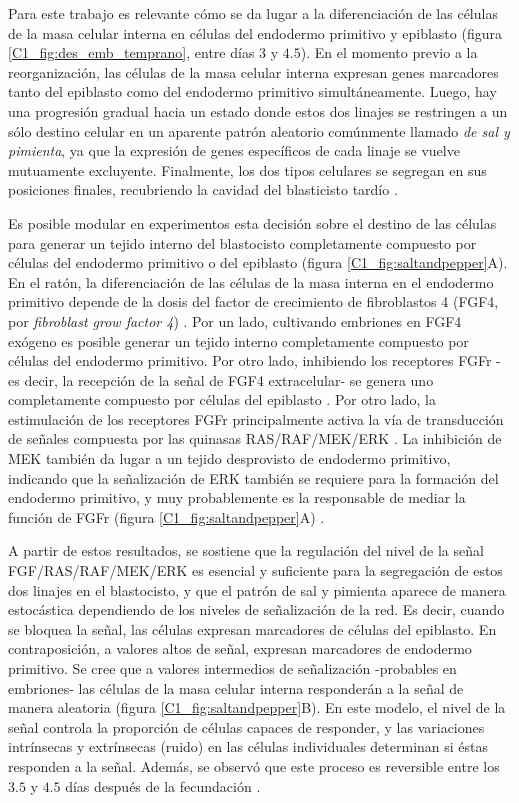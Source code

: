 \documentclass[./main.tex]{subfiles}
\begin{document}
Para este trabajo es relevante cómo se da lugar a la diferenciación de las células de la masa celular interna en células del endodermo primitivo y epiblasto (figura \ref{C1_fig:des_emb_temprano}, entre días $3$ y $4.5$). En el momento previo a la reorganización, las células de la masa celular interna expresan genes marcadores tanto del epiblasto como del endodermo primitivo simultáneamente. Luego, hay una progresión gradual hacia un estado donde estos dos linajes se restringen a un sólo destino celular en un aparente patrón aleatorio comúnmente llamado \emph{de sal y pimienta}, ya que la expresión de genes específicos de cada linaje se vuelve mutuamente excluyente. Finalmente, los dos tipos celulares se segregan en sus posiciones finales, recubriendo la cavidad del blasticisto tardío \cite{Plusa2008}. 


Es posible modular en experimentos esta decisión sobre el destino de las células para generar un tejido interno del blastocisto completamente compuesto por células del endodermo primitivo o del epiblasto (figura \ref{C1_fig:saltandpepper}A). En el ratón, la diferenciación de las células de la masa interna en el endodermo primitivo depende de la dosis del factor de crecimiento de fibroblastos 4 (FGF4, por \textit{fibroblast grow factor 4}) \cite{Kang2013,Krawchuk2013,Ohnishi2014}. Por un lado, cultivando embriones en FGF4 exógeno es posible generar un tejido interno completamente compuesto por células del endodermo primitivo. Por otro lado, inhibiendo los receptores FGFr -es decir, la recepción de la señal de FGF4 extracelular- se genera uno completamente compuesto por células del epiblasto \cite{Yamanaka2010,Grabarek2012}. Por otro lado, la estimulación de los receptores FGFr principalmente activa la vía de transducción de señales compuesta por las quinasas RAS/RAF/MEK/ERK \cite{Brewer2016}. La inhibición de MEK también da lugar a un tejido desprovisto de endodermo primitivo, indicando que la señalización de ERK también se requiere para la formación del endodermo primitivo, y muy probablemente es la responsable de mediar la función de FGFr (figura \ref{C1_fig:saltandpepper}A) \cite{Nichols2009}.  


A partir de estos resultados, se sostiene que la regulación del nivel de la señal FGF/RAS/RAF/MEK/ERK es esencial y suficiente para la segregación de estos dos linajes en el blastocisto, y que el patrón de sal y pimienta aparece de manera estocástica dependiendo de los niveles de señalización de la red. Es decir, cuando se bloquea la señal, las células expresan marcadores de células del epiblasto. En contraposición, a valores altos de señal, expresan marcadores de endodermo primitivo. Se cree que a valores intermedios de señalización -probables en embriones- las células de la masa celular interna responderán a la señal de manera aleatoria (figura \ref{C1_fig:saltandpepper}B). En este modelo, el nivel de la señal controla la proporción de células capaces de responder, y las variaciones intrínsecas y extrínsecas (ruido) en las células individuales determinan si éstas responden a la señal. Además, se observó que este proceso es reversible entre los $3.5$ y $4.5$ días después de la fecundación \cite{Yamanaka2010,Pokrass2020}.
\end{document}
